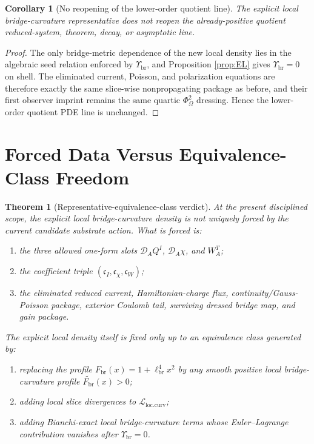 \documentclass[11pt]{article}
\newcommand{\SpatialD}{\mathcal D}
\newcommand{\FlowPot}{\Phi_\Omega}
\newcommand{\CurvSeedMult}{\Upsilon_{\mathrm{br}}}
\newcommand{\CurvScale}{\ell_{\mathrm{br}}}
\newcommand{\CurvProfile}{F_{\mathrm{br}}}
\newtheorem{corollary}{Corollary}
\newtheorem{theorem}{Theorem}
\begin{document}
\begin{corollary}[No reopening of the lower-order quotient line]
\label{cor:nopde}
The explicit local bridge-curvature representative does not reopen the already-positive quotient reduced-system, theorem, decay, or asymptotic line.
\end{corollary}

\begin{proof}
The only bridge-metric dependence of the new local density lies in the algebraic seed relation enforced by \(\CurvSeedMult\), and Proposition \ref{prop:EL} gives \(\CurvSeedMult=0\) on shell. The eliminated current, Poisson, and polarization equations are therefore exactly the same slice-wise nonpropagating package as before, and their first observer imprint remains the same quartic \(\FlowPot^2\) dressing. Hence the lower-order quotient PDE line is unchanged.
\end{proof}

\section{Forced Data Versus Equivalence-Class Freedom}

\begin{theorem}[Representative-equivalence-class verdict]
\label{thm:equivalence}
At the present disciplined scope, the explicit local bridge-curvature density is not uniquely forced by the current candidate substrate action. What is forced is:
\begin{enumerate}
    \item the three allowed one-form slots \(\SpatialD_AQ^I\), \(\SpatialD_A\chi\), and \(W_A^T\);
    \item the coefficient triple \((\mathfrak c_I,\mathfrak c_\chi,\mathfrak c_W)\);
    \item the eliminated reduced current, Hamiltonian-charge flux, continuity/Gauss-Poisson package, exterior Coulomb tail, surviving dressed bridge map, and gain package.
\end{enumerate}
The explicit local density itself is fixed only up to an equivalence class generated by:
\begin{enumerate}
    \item replacing the profile \(\CurvProfile(x)=1+\CurvScale^4x^2\) by any smooth positive local bridge-curvature profile \(\widetilde{\CurvProfile}(x)>0\);
    \item adding local slice divergences to \(\mathcal L_{\mathrm{loc.curv}}\);
    \item adding Bianchi-exact local bridge-curvature terms whose Euler--Lagrange contribution vanishes after \(\CurvSeedMult=0\).
\end{enumerate}
\end{theorem}
\end{document}
